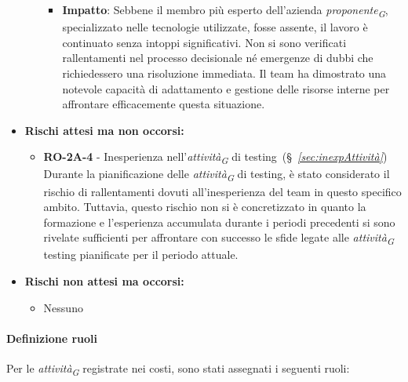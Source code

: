 \begin{itemize}
\begin{itemize}
\begin{itemize}
                    \item \textbf{Impatto}: 
                    Sebbene il membro più esperto dell'azienda \textit{proponente}\textsubscript{\textit{G}}, specializzato nelle tecnologie utilizzate, fosse assente, il lavoro è continuato senza intoppi significativi. Non si sono verificati rallentamenti nel processo decisionale né emergenze di dubbi che richiedessero una risoluzione immediata. Il team ha dimostrato una notevole capacità di adattamento e gestione delle risorse interne per affrontare efficacemente questa situazione.
                \end{itemize}
        \end{itemize}
    \item \textbf{Rischi attesi ma non occorsi:} 
        \begin{itemize}
            \item \textbf{RO-2A-4} - Inesperienza nell'\textit{attività}\textsubscript{\textit{G}} di testing~(\S~\textit{\ref{sec:inexpAttività}}) \\
            Durante la pianificazione delle \textit{attività}\textsubscript{\textit{G}} di testing, è stato considerato il rischio di rallentamenti dovuti all'inesperienza del team in questo specifico ambito. Tuttavia, questo rischio non si è concretizzato in quanto la formazione e l'esperienza accumulata durante i periodi precedenti si sono rivelate sufficienti per affrontare con successo le sfide legate alle \textit{attività}\textsubscript{\textit{G}} testing pianificate per il periodo attuale.
        \end{itemize}
    \item \textbf{Rischi non attesi ma occorsi:}
        \begin{itemize}
            \item Nessuno
        \end{itemize}
\end{itemize}


\paragraph{Definizione ruoli}
Per le \textit{attività}\textsubscript{\textit{G}} registrate nei costi, sono stati assegnati i seguenti ruoli: 

